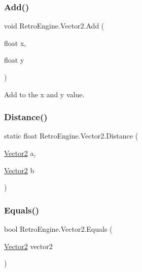 \subsubsection{\texorpdfstring{Add()}{Add()}}
{\footnotesize\ttfamily void Retro\+Engine.\+Vector2.\+Add (\begin{DoxyParamCaption}\item[{float}]{x,  }\item[{float}]{y }\end{DoxyParamCaption})}



Add to the x and y value. 

\mbox{\label{struct_retro_engine_1_1_vector2_ab823ae5da3aa2fc238b480f33f5721fa}} 
\subsubsection{\texorpdfstring{Distance()}{Distance()}}
{\footnotesize\ttfamily static float Retro\+Engine.\+Vector2.\+Distance (\begin{DoxyParamCaption}\item[{\mbox{\hyperlink{struct_retro_engine_1_1_vector2}{Vector2}}}]{a,  }\item[{\mbox{\hyperlink{struct_retro_engine_1_1_vector2}{Vector2}}}]{b }\end{DoxyParamCaption})\hspace{0.3cm}{\ttfamily [static]}}

\mbox{\label{struct_retro_engine_1_1_vector2_ae6d10d63393552c22792309b954d99a1}} 
\subsubsection{\texorpdfstring{Equals()}{Equals()}\hspace{0.1cm}{\footnotesize\ttfamily [1/2]}}
{\footnotesize\ttfamily bool Retro\+Engine.\+Vector2.\+Equals (\begin{DoxyParamCaption}\item[{\mbox{\hyperlink{struct_retro_engine_1_1_vector2}{Vector2}}}]{vector2 }\end{DoxyParamCaption})}



